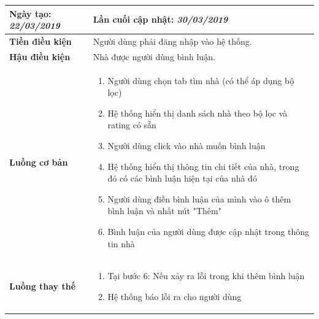 \begin{enumerate}[label=\textbf{(\alph*)}]
\begin{center}
\begin{longtable}{ | l |p{10cm}|}
			\textbf{Ngày tạo:} \textit{22/03/2019} & \textbf{Lần cuối cập nhật:} \textit{30/03/2019} \\ \hline
			\textbf{Tiền điều kiện} &  Người dùng phải đăng nhập vào hệ thống. \\ \hline 
			\textbf{Hậu điều kiện} &  Nhà được người dùng bình luận. \\ \hline 
			\textbf{Luồng cơ bản} & 
			\begin{enumerate}
			\item Người dùng chọn tab tìm nhà (có thể áp dụng bộ lọc)
    \item Hệ thống hiển thị danh sách nhà theo bộ lọc và rating có sẵn
    \item Người dùng click vào nhà muốn bình luận
    \item Hệ thống hiển thị thông tin chi tiết của nhà, trong đó có các bình luận hiện tại của nhà đó
    \item Người dùng điền bình luận của mình vào ô thêm bình luận và nhất nút "Thêm"
    \item Bình luận của người dùng được cập nhật trong thông tin nhà
			\end{enumerate} \\ \hline 
			\textbf{Luồng thay thế} & 
			\begin{enumerate}
				\item Tại bước 6: Nếu xảy ra lỗi trong khi thêm bình luận
				\item Hệ thống báo lỗi ra cho người dùng
			\end{enumerate} \\ \hline
		

\end{longtable}
\end{center}
\end{enumerate}
